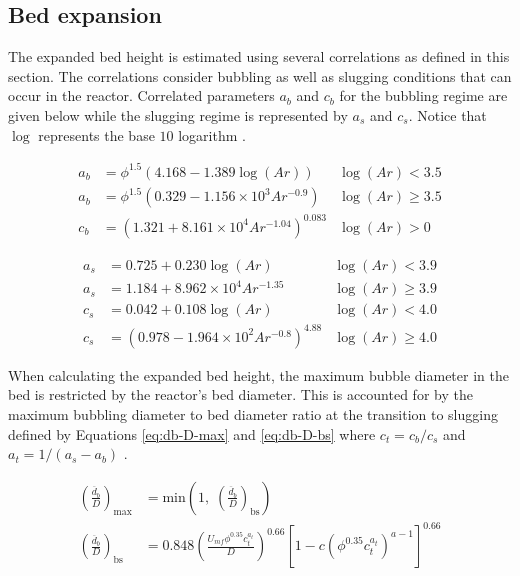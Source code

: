 \documentclass[12pt,titlepage]{article}
\begin{document}
\subsection{Bed expansion}

The expanded bed height is estimated using several correlations as defined in this section. The correlations consider bubbling as well as slugging conditions that can occur in the reactor. Correlated parameters $a_b$ and $c_b$ for the bubbling regime are given below while the slugging regime is represented by $a_s$ and $c_s$. Notice that $\log$ represents the base $10$ logarithm \cite{Agu-2018}.

\begin{align}
    a_b &= \phi^{1.5} (4.168 - 1.389 \log(Ar))            & \log(Ar) < 3.5 \\
    a_b &= \phi^{1.5} (0.329 - 1.156\times10^3 Ar^{-0.9}) & \log(Ar) \geq 3.5\\
    c_b &= (1.321 + 8.161\times10^4 Ar^{-1.04})^{0.083}   & \log(Ar) > 0
\end{align}

\begin{align}
    a_s &= 0.725 + 0.230 \log(Ar)                     & \log(Ar) < 3.9 \\
    a_s &= 1.184 + 8.962\times10^4 Ar^{-1.35}         & \log(Ar) \geq 3.9 \\
    c_s &= 0.042 + 0.108 \log(Ar)                     & \log(Ar) < 4.0 \\
    c_s &= (0.978 - 1.964\times10^2 Ar^{-0.8})^{4.88} & \log(Ar) \geq 4.0
\end{align}

When calculating the expanded bed height, the maximum bubble diameter in the bed is restricted by the reactor's bed diameter. This is accounted for by the maximum bubbling diameter to bed diameter ratio at the transition to slugging defined by Equations \ref{eq:db-D-max} and \ref{eq:db-D-bs} where $c_t = c_b / c_s$ and $a_t = 1 / (a_s - a_b)$ \cite{Agu-2019g}.

\begin{align}
    \left( \frac{\overline{d}_b}{D} \right)_\text{max} &= \text{min} \left(1,\; \left( \frac{\overline{d}_b}{D} \right)_\text{bs} \right) \label{eq:db-D-max} \\
    \left( \frac{\overline{d}_b}{D} \right)_\text{bs} &= 0.848 \left( \frac{U_{mf} \phi^{0.35} c_t^{a_t}}{D} \right)^{0.66} \left[ 1 - c (\phi^{0.35} c_t^{a_t})^{a-1} \right]^{0.66} \label{eq:db-D-bs}
\end{align}
\end{document}
